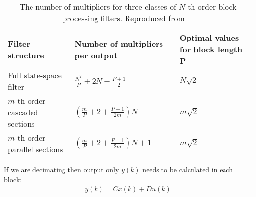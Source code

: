 \documentclass[a4paper,twoside,10pt,english]{report}
\begin{document}
\begin{table}[!hptb]
\begin{threeparttable}
\centering
\bgroup{}
\def\arraystretch{2}
\begin{tabular}{lll}
\hline
Filter structure & Number of multipliers per output & Optimal values for block length P\\
\hline
Full state-space filter & $\frac{N^{2}}{P}+2N+\frac{P+1}{2}$ & $N\sqrt{2}$ \\
$m$-th order cascaded sections & $\left(\frac{m}{P}+2+\frac{P+1}{2m}\right)N$ & $m\sqrt{2}$ \\
$m$-th order parallel sections & $\left(\frac{m}{P}+2+\frac{P-1}{2m}\right)N+1$ & $m\sqrt{2}$ \\
\hline
\end{tabular}
\egroup{}
\caption[The number of multipliers for three classes of block filters]{
The number of multipliers for three classes of $N$-th order block processing
filters. Reproduced from \protect~\cite[Table 10.2.1]
{RobertsMullis_DigitalSignalProcessing}.}
\label{tab:block-filter-multipliers-per-output}
\end{threeparttable}
\end{table}

If we are decimating then output only $y(k)$ needs to be calculated in each 
block:
\begin{align*}
y\left(k\right)=Cx\left(k\right)+Du\left(k\right)
\end{align*}
\end{document}
